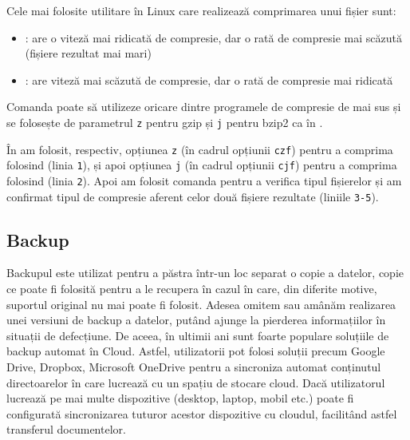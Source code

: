 Cele mai folosite utilitare în Linux care realizează comprimarea unui fișier sunt:

\begin{itemize}
  \item {}: are o viteză mai ridicată de compresie, dar o rată de compresie mai scăzută (fișiere rezultat mai mari)
  \item {}: are viteză mai scăzută de compresie, dar o rată de compresie mai ridicată
\end{itemize}

Comanda  poate să utilizeze oricare dintre programele de compresie de mai sus și se folosește de parametrul \texttt{z} pentru gzip și \texttt{j} pentru bzip2 ca în .


În  am folosit, respectiv, opțiunea \texttt{z} (în cadrul opțiunii \texttt{czf}) pentru a comprima folosind  (linia \texttt{1}), și apoi opțiunea \texttt{j} (în cadrul opțiunii \texttt{cjf}) pentru a comprima folosind  (linia \texttt{2}).
Apoi am folosit comanda  pentru a verifica tipul fișierelor și am confirmat tipul de compresie aferent celor două fișiere rezultate (liniile \texttt{3-5}).

\subsection{Backup}
\label{sec:fs:backup}

Backupul este utilizat pentru a păstra într-un loc separat o copie a datelor, copie ce poate fi folosită pentru a le recupera în cazul în care, din diferite motive, suportul original nu mai poate fi folosit.
Adesea omitem sau amânăm realizarea unei versiuni de backup a datelor, putând ajunge la pierderea informațiilor în situații de defecțiune.
De aceea, în ultimii ani sunt foarte populare soluțiile de backup automat în Cloud.
Astfel, utilizatorii pot folosi soluții precum Google Drive, Dropbox, Microsoft OneDrive pentru a sincroniza automat conținutul directoarelor în care lucrează cu un spațiu de stocare cloud.
Dacă utilizatorul lucrează pe mai multe dispozitive (desktop, laptop, mobil etc.) poate fi configurată sincronizarea tuturor acestor dispozitive cu cloudul, facilitând astfel transferul documentelor.

